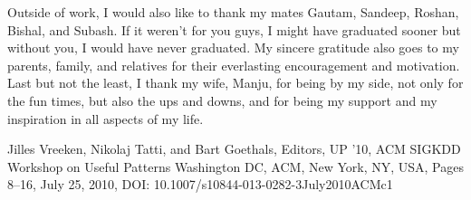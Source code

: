 \documentclass[dissertation]{aaltoseries}
\begin{document}
\begin{preface}[Espoo]
Outside of work, I would also like to thank my mates Gautam, Sandeep, Roshan, Bishal, and Subash. 
If it weren’t for you guys, I might have graduated sooner but without you, I would have 
never graduated. My sincere gratitude also goes to my parents, family, and relatives 
for their everlasting encouragement and motivation. Last but not the least, I thank my 
wife, Manju, for being by my side, not only for the fun times, but also the ups and downs,
and for being my support and my inspiration in all aspects of my life.

\end{preface}

\tableofcontents

\listofpublications

{}

 
 

 

 



















{Jilles Vreeken, Nikolaj Tatti, and  Bart Goethals, Editors, UP '10, ACM SIGKDD Workshop on Useful Patterns}
{Washington DC, ACM, New York, NY, USA, Pages 8--16, July 25, 2010, DOI: 10.1007/s10844-013-0282-3}{July}{2010}{ACM}{c1}
\end{document}
